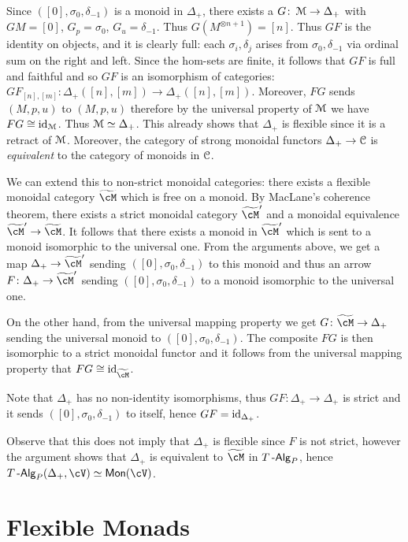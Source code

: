 \documentclass[a4paper,11pt,oneside,openany]{scrbook}
\begin{document}
\begin{exmp}
Since $([0],\sigma_0,\delta_{-1})$ is a monoid in $\Delta_+$, there exists a $G\colon \operatorname{\mathcal{M}}\to\Delta_+$ with $GM=[0]$, $G_p=\sigma_0$, $G_u=\delta_{-1}$. Thus $G(M^{\otimes n+1})=[n]$. Thus $GF$ is the identity on objects, and it is clearly full: each $\sigma_i,\delta_j$ arises from $\sigma_0, \delta_{-1}$ via ordinal sum on the right and left. Since the hom-sets are finite, it follows that $GF$ is full and faithful and so $GF$ is an isomorphism of categories: $GF_{[n],[m]}\colon\Delta_+([n],[m])\to\Delta_+([n],[m])$. Moreover, $FG$ sends $(M,p,u)$ to $(M,p,u)$ therefore by the universal property of $\operatorname{\mathcal{M}}$ we have $FG\cong \operatorname{id}_{\operatorname{\mathcal{M}}}$. Thus $\operatorname{\mathcal{M}}\simeq\Delta_+$. This already shows that $\Delta_+$ is flexible since it is a retract of $\operatorname{\mathcal{M}}$. Moreover, the category of strong monoidal functors $\Delta_+\to\operatorname{\mathcal{C}}$ is \emph{equivalent} to the category of monoids in $\operatorname{\mathcal{C}}$.    
\end{exmp}

We can extend this to non-strict monoidal categories: there exists a flexible
monoidal category $\widetilde{\cM}$ which is free on a monoid. By MacLane's
coherence theorem, there exists a strict monoidal category $\widetilde{\cM}'$ and a
monoidal equivalence $\widetilde{\cM}'\rightarrow\widetilde{\cM}$. It follows that there
exists a monoid in $\widetilde{\cM}'$ which is sent to a monoid isomorphic to the
universal one. From the arguments above, we get a map
$\Delta_+\rightarrow\widetilde{\cM}'$ sending $([0],\sigma_0,\delta_{-1})$ to this
monoid and thus an arrow $F\colon\Delta_+\rightarrow\widetilde{\cM}'$ sending
$([0],\sigma_0,\delta_{-1})$ to a monoid isomorphic to the universal one.

On the other hand, from the universal mapping property we get
$G\colon\widetilde{\cM}\rightarrow\Delta_+$ sending the universal monoid to
$([0],\sigma_0,\delta_{-1})$. The composite $FG$ is then isomorphic to a strict
monoidal functor and it follows from the universal mapping property that
$FG\cong\id_{\widetilde{\cM}}$.

Note that $\Delta_+$ has no non-identity isomorphisms, thus
$GF\colon\Delta_+\rightarrow\Delta_+$ is strict and it sends
$([0],\sigma_0,\delta_{-1})$ to itself, hence $GF=\operatorname{id}_{\Delta_+}$.

Observe that this does not imply that $\Delta_+$ is flexible since $F$ is not
strict, however the argument shows that $\Delta_+$ is equivalent to
$\widetilde{\cM}$ in $T\operatorname{-\mathsf{Alg}}_P$, hence $T\Alg_P(\Delta_+,\cV)\simeq\Mon(\cV)$.


\section{Flexible Monads}
\end{document}
